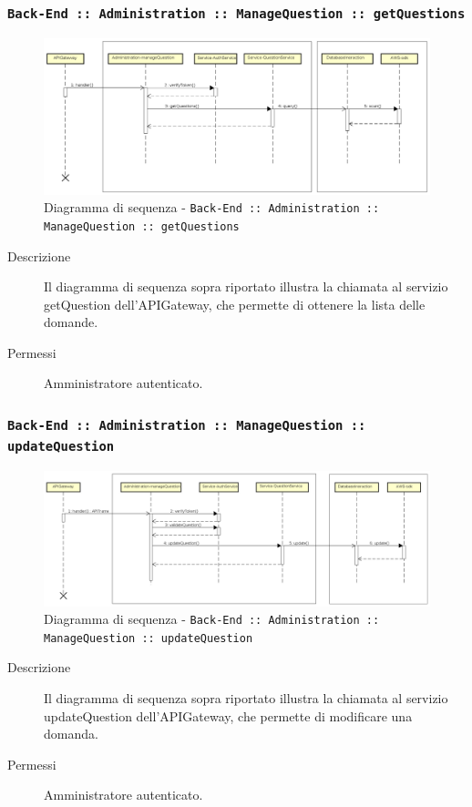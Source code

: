 \documentclass[../DefinizioneDiProdotto_v3.0.0.tex]{subfiles}
\begin{document}
\newpage
\subsubsection{\texttt{Back-End :: Administration :: ManageQuestion :: getQuestions}}
\begin{figure}[!h]
	\centering
	\includegraphics[width=\textwidth]{DiagrammiSequenza/Back-End/manageQuestion/getQuestion.png}
	\caption{Diagramma di sequenza - \texttt{Back-End :: Administration :: ManageQuestion :: getQuestions }}
\end{figure}
\begin{description}
	\item [Descrizione] Il diagramma di sequenza sopra riportato illustra la chiamata al servizio getQuestion dell'APIGateway, che permette di ottenere la lista delle domande.
	\item [Permessi] Amministratore autenticato.
\end{description}

\subsubsection{\texttt{Back-End :: Administration :: ManageQuestion :: updateQuestion}}
\begin{figure}[!h]
	\centering
	\includegraphics[width=\textwidth]{DiagrammiSequenza/Back-End/manageQuestion/updateQuestion.png}
	\caption{Diagramma di sequenza - \texttt{Back-End :: Administration :: ManageQuestion :: updateQuestion} }
\end{figure}
\begin{description}
	\item [Descrizione] Il diagramma di sequenza sopra riportato illustra la chiamata al servizio updateQuestion dell'APIGateway, che permette di modificare una domanda.
	\item [Permessi] Amministratore autenticato.
\end{description}
\end{document}
